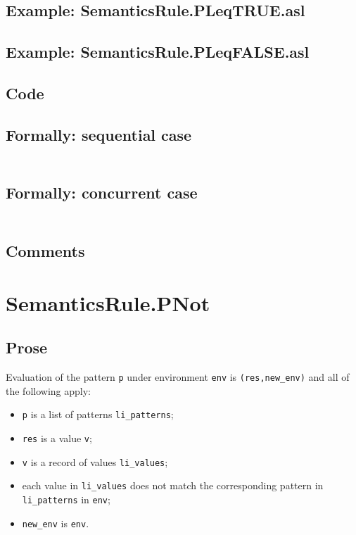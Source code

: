 \documentclass{book}
\begin{document}
    \subsection{Example: SemanticsRule.PLeqTRUE.asl}

    \subsection{Example: SemanticsRule.PLeqFALSE.asl}

  \subsection{Code}

  \subsection{Formally: sequential case}
  \begin{align}
  \end{align} 

  \subsection{Formally: concurrent case}
  \begin{align}
  \end{align} 

    \subsection{Comments}

\section{SemanticsRule.PNot \label{sec:SemanticsRule.PNot}}

    \subsection{Prose}
   Evaluation of the pattern \texttt{p} under environment \texttt{env} is
  \texttt{(res,new\_env)} and all of the following apply:
    \begin{itemize}
    \item \texttt{p} is a list of patterns \texttt{li\_patterns};
    \item \texttt{res} is a value \texttt{v};
    \item \texttt{v} is a record of values \texttt{li\_values};
    \item each value in \texttt{li\_values} does not match the corresponding pattern in \texttt{li\_patterns} in \texttt{env};
    \item \texttt{new\_env} is \texttt{env}.
    \end{itemize}
 
\end{document}
